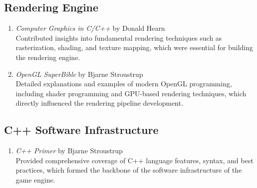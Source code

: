 \documentclass[12pt twoside]{report}
\begin{document}
        \subsection*{Rendering Engine}
        \begin{enumerate}
            \item \textit{Computer Graphics in C/C++} by Donald Hearn\\
            Contributed insights into fundamental rendering techniques such as rasterization, shading, and texture mapping, which were essential for building the rendering engine.
            
            \item \textit{OpenGL SuperBible} by Bjarne Stroustrup \\
            Detailed explanations and examples of modern OpenGL programming, including shader programming and GPU-based rendering techniques, which directly influenced the rendering pipeline development.
        \end{enumerate}

        \subsection*{C++ Software Infrastructure}
        \begin{enumerate}
            \item \textit{C++ Primer} by Bjarne Stroustrup \\
            Provided comprehensive coverage of C++ language features, syntax, and best practices, which formed the backbone of the software infrastructure of the game engine.
        \end{enumerate}
\end{document}
